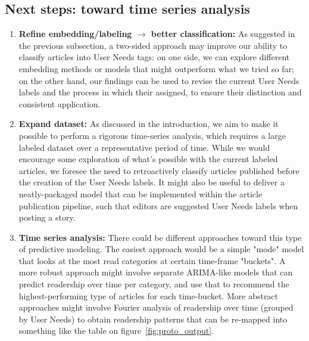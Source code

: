 \documentclass[11pt]{article}
\begin{document}
\subsection{Next steps: toward time series analysis}
\begin{enumerate}
    \item \textbf{Refine embedding/labeling $\rightarrow$ better classification:}
    As suggested in the previous subsection, a two-sided approach may improve our ability to classify articles into User Needs tags: on one side, we can explore different embedding methods or models that might outperform what we tried so far; on the other hand, our findings can be used to revise the current User Needs labels and the process in which their assigned, to ensure their distinction and consistent application.
    \item \textbf{Expand dataset:} As discussed in the introduction, we aim to make it possible to perform a rigorous time-series analysis, which requires a large labeled dataset over a representative period of time. While we would encourage some exploration of what's possible with the current labeled articles, we foresee the need to retroactively classify articles published before the creation of the User Needs labels. It might also be useful to deliver a neatly-packaged model that can be implemented within the article publication pipeline, such that editors are suggested User Needs labels when posting a story.
    \item \textbf{Time series analysis:}  There could be different approaches toward this type of predictive modeling. The easiest approach would be a simple "mode" model that looks at the most read categories at certain time-frame "buckets". A more robust approach might involve separate ARIMA-like models that can predict readership over time per category, and use that to recommend the highest-performing type of articles for each time-bucket. More abstract approaches might involve Fourier analysis of readership over time (grouped by User Needs) to obtain readership patterns that can be re-mapped into something like the table on figure~\ref{fig:proto_output}.
\end{enumerate}



\newpage


\end{document}

